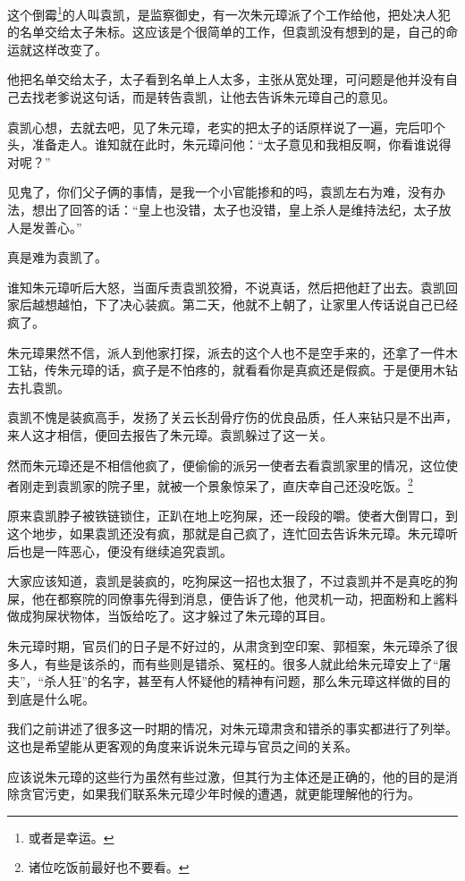 \begin{multicols}{\theparacolNo}
		这个倒霉\footnote{或者是幸运。}的人叫袁凯，是监察御史，有一次朱元璋派了个工作给他，把处决人犯的名单交给太子朱标。这应该是个很简单的工作，但袁凯没有想到的是，自己的命运就这样改变了。

		他把名单交给太子，太子看到名单上人太多，主张从宽处理，可问题是他并没有自己去找老爹说这句话，而是转告袁凯，让他去告诉朱元璋自己的意见。

		袁凯心想，去就去吧，见了朱元璋，老实的把太子的话原样说了一遍，完后叩个头，准备走人。谁知就在此时，朱元璋问他：“太子意见和我相反啊，你看谁说得对呢？”

		见鬼了，你们父子俩的事情，是我一个小官能掺和的吗，袁凯左右为难，没有办法，想出了回答的话：“皇上也没错，太子也没错，皇上杀人是维持法纪，太子放人是发善心。”

		真是难为袁凯了。

		谁知朱元璋听后大怒，当面斥责袁凯狡猾，不说真话，然后把他赶了出去。袁凯回家后越想越怕，下了决心装疯。第二天，他就不上朝了，让家里人传话说自己已经疯了。

		朱元璋果然不信，派人到他家打探，派去的这个人也不是空手来的，还拿了一件木工钻，传朱元璋的话，疯子是不怕疼的，就看看你是真疯还是假疯。于是便用木钻去扎袁凯。

		袁凯不愧是装疯高手，发扬了关云长刮骨疗伤的优良品质，任人来钻只是不出声，来人这才相信，便回去报告了朱元璋。袁凯躲过了这一关。

		然而朱元璋还是不相信他疯了，便偷偷的派另一使者去看袁凯家里的情况，这位使者刚走到袁凯家的院子里，就被一个景象惊呆了，直庆幸自己还没吃饭。\footnote{诸位吃饭前最好也不要看。}

		原来袁凯脖子被铁链锁住，正趴在地上吃狗屎，还一段段的嚼。使者大倒胃口，到这个地步，如果袁凯还没有疯，那就是自己疯了，连忙回去告诉朱元璋。朱元璋听后也是一阵恶心，便没有继续追究袁凯。

		大家应该知道，袁凯是装疯的，吃狗屎这一招也太狠了，不过袁凯并不是真吃的狗屎，他在都察院的同僚事先得到消息，便告诉了他，他灵机一动，把面粉和上酱料做成狗屎状物体，当饭给吃了。这才躲过了朱元璋的耳目。

		朱元璋时期，官员们的日子是不好过的，从肃贪到空印案、郭桓案，朱元璋杀了很多人，有些是该杀的，而有些则是错杀、冤枉的。很多人就此给朱元璋安上了“屠夫”，“杀人狂”的名字，甚至有人怀疑他的精神有问题，那么朱元璋这样做的目的到底是什么呢。

		我们之前讲述了很多这一时期的情况，对朱元璋肃贪和错杀的事实都进行了列举。这也是希望能从更客观的角度来诉说朱元璋与官员之间的关系。

		应该说朱元璋的这些行为虽然有些过激，但其行为主体还是正确的，他的目的是消除贪官污吏，如果我们联系朱元璋少年时候的遭遇，就更能理解他的行为。


\end{multicols}

